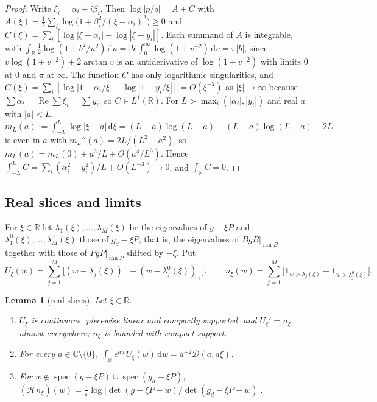 \documentclass[11pt]{amsart}
\newtheorem{lemma}[theorem]{Lemma}
\theoremstyle{definition}
\theoremstyle{remark}
\numberwithin{equation}{section}
\newcommand{\R}{\mathbb{R}}
\newcommand{\C}{\mathbb{C}}
\newcommand{\spec}{\operatorname{spec}}
\renewcommand{\Re}{\operatorname{Re}}
\newcommand{\one}{\mathbf{1}}
\newcommand{\cD}{\mathcal{D}}
\newcommand{\cH}{\mathcal{H}}
\newcommand{\dd}{\,\mathrm{d}}
\begin{document}
\begin{proof}
Write $\xi_i=\alpha_i+i\beta_i$. Then $\log|p/q|=A+C$ with
$A(\xi)=\frac12\sum_i\log\bigl(1+\beta_i^2/(\xi-\alpha_i)^2\bigr)\ge0$ and $C(\xi)=\sum_i[\log|\xi-\alpha_i|-\log|\xi-y_i|]$. Each
summand of $A$ is integrable, with $\int_\R\frac12\log(1+b^2/u^2)\dd u=|b|\int_0^\infty\log(1+v^{-2})\dd v=\pi|b|$, since
$v\log(1+v^{-2})+2\arctan v$ is an antiderivative of $\log(1+v^{-2})$ with limits $0$ at $0$ and $\pi$ at $\infty$. The
function $C$ has only logarithmic singularities, and $C(\xi)=\sum_i[\log|1-\alpha_i/\xi|-\log|1-y_i/\xi|]=O(\xi^{-2})$
as $|\xi|\to\infty$ because $\sum\alpha_i=\Re\sum\xi_i=\sum y_i$; so $C\in L^1(\R)$. For $L>\max_i(|\alpha_i|,|y_i|)$ and real
$a$ with $|a|<L$,
$m_L(a):=\int_{-L}^L\log|\xi-a|\dd\xi=(L-a)\log(L-a)+(L+a)\log(L+a)-2L$ is even in $a$ with
$m_L''(a)=2L/(L^2-a^2)$, so $m_L(a)=m_L(0)+a^2/L+O(a^4/L^3)$. Hence
$\int_{-L}^LC=\sum_i(\alpha_i^2-y_i^2)/L+O(L^{-3})\to0$, and $\int_\R C=0$.
\end{proof}

\subsection{Real slices and limits}
For $\xi\in\R$ let $\lambda_1(\xi),\dots,\lambda_M(\xi)$ be the eigenvalues of $g-\xi P$ and
$\lambda^0_1(\xi),\dots,\lambda^0_M(\xi)$ those of $g_d-\xi P$, that is, the eigenvalues of $BgB|_{\operatorname{ran}B}$
together with those of $PgP|_{\operatorname{ran}P}$ shifted by $-\xi$. Put
\[
U_\xi(w)=\sum_{j=1}^M\bigl[(w-\lambda_j(\xi))_+-(w-\lambda^0_j(\xi))_+\bigr],\qquad
n_\xi(w)=\sum_{j=1}^M\bigl[\one_{w>\lambda_j(\xi)}-\one_{w>\lambda^0_j(\xi)}\bigr].
\]

\begin{lemma}[real slices]\label{lem:slices}
Let $\xi\in\R$.
\begin{enumerate}
\item $U_\xi$ is continuous, piecewise linear and compactly supported, and $U_\xi'=n_\xi$ almost everywhere; $n_\xi$ is
bounded with compact support.
\item For every $a\in\C\setminus\{0\}$, $\int_\R e^{aw}U_\xi(w)\dd w=a^{-2}\cD(a,a\xi)$.
\item For $w\notin\spec(g-\xi P)\cup\spec(g_d-\xi P)$,
$(\cH n_\xi)(w)=\frac1\pi\log\bigl|\det(g-\xi P-w)/\det(g_d-\xi P-w)\bigr|$.
\end{enumerate}
\end{lemma}
\end{document}

